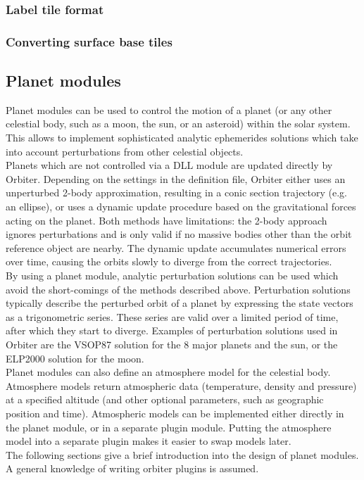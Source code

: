 \documentclass[Orbiter Developer Manual.tex]{subfiles}
\begin{document}
\subsubsection{Label tile format}
\subsubsection{Converting surface base tiles}



\subsection{Planet modules}
Planet modules can be used to control the motion of a planet (or any other celestial body, such as a moon, the sun, or an asteroid) within the solar system. This allows to implement sophisticated analytic ephemerides solutions which take into account perturbations from other celestial objects.\\
Planets which are not controlled via a DLL module are updated directly by Orbiter. Depending on the settings in the definition file, Orbiter either uses an unperturbed 2-body approximation, resulting in a conic section trajectory (e.g. an ellipse), or uses a dynamic update procedure based on the gravitational forces acting on the planet. Both methods have limitations: the 2-body approach ignores perturbations and is only valid if no massive bodies other than the orbit reference object are nearby. The dynamic update accumulates numerical errors over time, causing the orbits slowly to diverge from the correct trajectories.\\
By using a planet module, analytic perturbation solutions can be used which avoid the short-comings of the methods described above. Perturbation solutions typically describe the perturbed orbit of a planet by expressing the state vectors as a trigonometric series. These series are valid over a limited period of time, after which they start to diverge. Examples of perturbation solutions used in Orbiter are the VSOP87 solution for the 8 major planets and the sun, or the ELP2000 solution for the moon.\\
Planet modules can also define an atmosphere model for the celestial body. Atmosphere models return atmospheric data (temperature, density and pressure) at a specified altitude (and other optional parameters, such as geographic position and time). Atmospheric models can be implemented either directly in the planet module, or in a separate plugin module. Putting the atmosphere model into a separate plugin makes it easier to swap models later.\\
The following sections give a brief introduction into the design of planet modules. A general knowledge of writing orbiter plugins is assumed.
\end{document}
